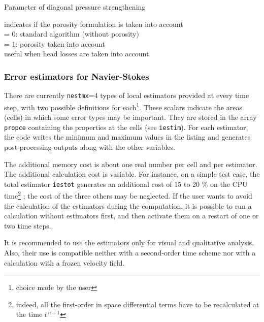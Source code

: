 {Parameter of diagonal pressure strengthening
}

{indicates if the porosity formulation is taken into account\\
\hspace*{1.3cm}= 0: standard algorithm (without porosity)\\
\hspace*{1.3cm}= 1: porosity taken into account\\
useful when head losses are taken into account
}

\subsubsection{Error estimators for Navier-Stokes}

There are currently {\tt nestmx}=4 types of local estimators
provided at every time step, with two possible definitions for
each\footnote{choice made by the user}. These scalars indicate the areas
(cells) in which some error types may be important. They are
stored in the array {\tt propce} containing the properties at the cells (see
{\tt iestim}). For each estimator, the code writes the minimum and
maximum values in the listing and generates post-processing outputs along with
the other variables.

The additional memory cost is about one real number per cell and per
estimator. The additional calculation cost is variable. For instance, on a
simple test case, the total estimator {\tt iestot} generates an additional cost
of 15 to 20 $\%$ on the CPU time\footnote{indeed, all the first-order in
space differential terms have to be recalculated at the time $t^{\,n+1}$} ;
the cost of the three others may be neglected. If the user wants to
avoid the calculation of the estimators during the computation, it is
possible to run a calculation without estimators first, and then activate them on
a restart of one or two time steps.

It is recommended to use the estimators only for visual and qualitative
analysis. Also, their use is compatible neither with a second-order time scheme
nor with a calculation with a frozen velocity field.

